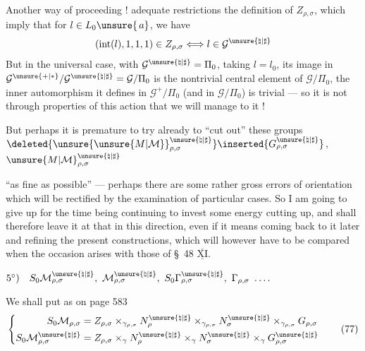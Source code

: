Another way of proceeding !
  adequate restrictions 
the definition of $Z_{\rho,\sigma}$, which
imply that
for $l\in L_0\unsure{\,a}$, we have
\[
(\mathrm{int}(l),1,1,1)\in Z_{\rho,\sigma}
\Longleftrightarrow
l\in\mathcal{G}^{\unsure{\natural|\sharp}}
\]
But in the universal case, with
$\mathcal{G}^{\unsure{\natural|\sharp}}=\Pi_0$,
taking $l=l_0$, its image in
$\mathcal{G}^{\unsure{+|*}}/
\mathcal{G}^{\unsure{\natural|\sharp}}
=\mathcal{G}/\Pi_0$
is the nontrivial central element of
$\mathcal{G}/\Pi_0$,
the inner automorphism it defines in
$\mathcal{G}^+/\Pi_0$
(and  in
$\mathcal{G}/\Pi_0$)
is trivial --- so it is not through
 properties of this action
that we will manage to  it !

But perhaps it is premature to try already to ``cut out'' these groups
$\deleted{\unsure{\unsure{M|\mathcal{M}}}_{\rho,\sigma}^{\unsure{\natural|\sharp}}}
\inserted{G_{\rho,\sigma}^{\unsure{\natural|\sharp}}}$,
$\unsure{M|\mathcal{M}}_{\rho,\sigma}^{\unsure{\natural|\sharp}}$



``as fine as possible'' --- perhaps there are
 some rather gross errors of orientation which
will be rectified by the examination of particular
cases. So I am going to give up
for the time being continuing to invest 
some energy  cutting up, and shall
therefore leave it at that in this direction, even if
it means coming back to it later and refining
the present constructions, which will
however have to be compared when the occasion arises with those
of \S~48 $\overline{\underline{\mathrm{XI}}}$.




$5^\circ)\quad S_0\mathcal{M}_{\rho,\sigma}^{\unsure{\natural|\sharp}},\ \mathcal{M}_{\rho,\sigma}^{\unsure{\natural|\sharp}},\ S_0\Gamma_{\rho,\sigma}^{\unsure{\natural|\sharp}},\ \Gamma_{\rho,\sigma}\ \ldots .$

We shall put as on page 583
\[
\left\{\begin{aligned}
S_0\mathcal{M}_{\rho,\sigma}
 &= Z_{\rho,\sigma}\times_{\gamma_{\rho,\sigma}}N_\rho^{\unsure{\natural|\sharp}}
 \times_{\gamma_{\rho,\sigma}}N_\sigma^{\unsure{\natural|\sharp}}
 \times_{\gamma_{\rho,\sigma}}G_{\rho,\sigma}\\
S_0\mathcal{M}_{\rho,\sigma}^{\unsure{\natural|\sharp}}
 &= Z_{\rho,\sigma}\times_\gamma N_\rho^{\unsure{\natural|\sharp}}
 \times_\gamma N_\sigma^{\unsure{\natural|\sharp}}\times_\gamma G_{\rho,\sigma}^{\unsure{\natural|\sharp}}
\end{aligned}\right.
\tag{77}
\]


